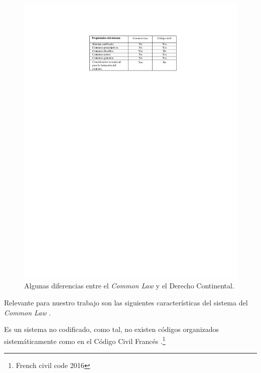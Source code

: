 \documentclass[12pt]{report} %
\begin{document}
\begin{figure}
\centering
\includegraphics[width=0.85\columnwidth]{imagenes/tablacontratos2.pdf}
\caption{Algunas diferencias entre el \textit{Common Law} y el Derecho Continental.}
\label{tablacontratos2}
\end{figure} 

Relevante para nuestro trabajo son las siguientes características del sistema del \textit{Common Law} .

Es un sistema no codificado, como tal, no existen códigos organizados sistemáticamente como en el Código Civil Francés .\footnote{\cite{JohnCart2016}French civil code 2016}
\end{document}
